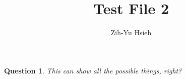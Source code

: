 \documentclass{article}
\title{Test File 2}
\author{Zih-Yu Hsieh}
\newtheorem{question}{Question}
\begin{document}
\maketitle

\begin{question}
    This can show all the possible things, right?
\end{question}
\end{document}
